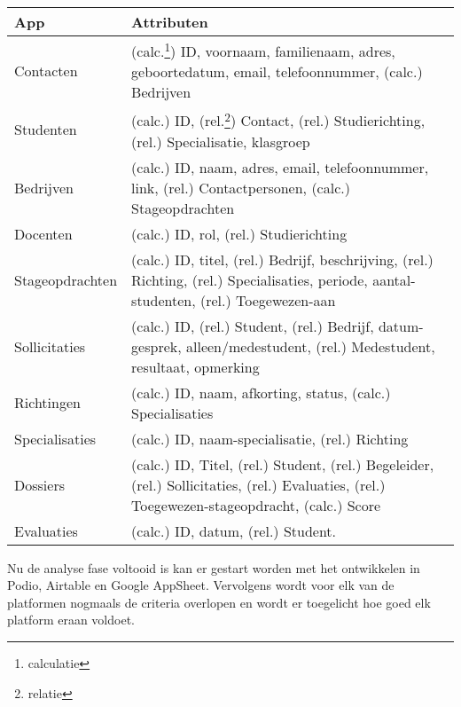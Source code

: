 \begin{table}
    \centering
    \caption{\label{tab:Resultaat analyse} }
    \begin{tabular}{ | p{4cm} | p{8cm} | }
        \hline
        \textbf{App} & \textbf{Attributen} \\
        \hline\hline
        Contacten       & (calc.\footnote{calculatie}) ID, voornaam, familienaam, adres, geboortedatum, email, telefoonnummer, (calc.) Bedrijven \\
        Studenten       & (calc.) ID, (rel.\footnote{relatie}) Contact, (rel.) Studierichting, (rel.)  Specialisatie, klasgroep \\
        Bedrijven       & (calc.) ID, naam, adres, email, telefoonnummer, link, (rel.) Contactpersonen, (calc.) Stageopdrachten \\
        Docenten        & (calc.) ID, rol, (rel.) Studierichting \\
        Stageopdrachten & (calc.) ID, titel, (rel.) Bedrijf, beschrijving, (rel.) Richting, (rel.) Specialisaties, periode, aantal-studenten, (rel.) Toegewezen-aan \\
        Sollicitaties   & (calc.) ID, (rel.) Student, (rel.) Bedrijf, datum-gesprek, alleen/medestudent, (rel.) Medestudent, resultaat, opmerking \\
        Richtingen      & (calc.) ID, naam, afkorting, status, (calc.) Specialisaties \\
        Specialisaties  & (calc.) ID, naam-specialisatie, (rel.) Richting \\
        Dossiers        & (calc.) ID, Titel, (rel.) Student, (rel.) Begeleider, (rel.) Sollicitaties, (rel.) Evaluaties, (rel.) Toegewezen-stageopdracht, (calc.) Score \\
        Evaluaties      & (calc.) ID, datum, (rel.) Student. \\
        \hline
    \end{tabular}
\end{table}

Nu de analyse fase voltooid is kan er gestart worden met het ontwikkelen in Podio, Airtable en Google AppSheet. Vervolgens wordt voor elk van de platformen nogmaals de criteria overlopen en wordt er toegelicht hoe goed elk platform eraan voldoet. \\

\newpage



